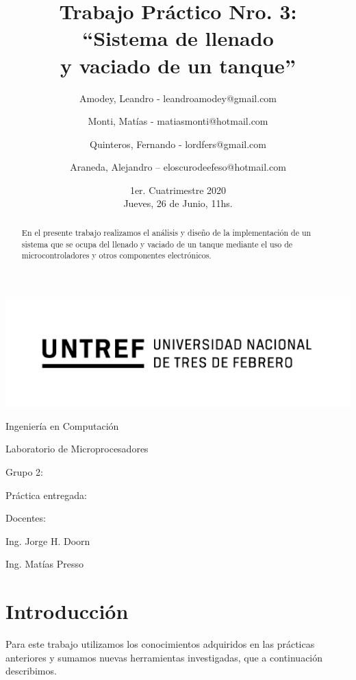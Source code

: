 \documentclass[a4paper]{article}
\title{Trabajo Práctico Nro. 3:\\``Sistema de llenado\\y vaciado de un tanque''}
\author{Amodey, Leandro - leandroamodey@gmail.com
\and Monti, Matías - matiasmonti@hotmail.com
\and Quinteros, Fernando - lordfers@gmail.com
\and Araneda, Alejandro – eloscurodeefeso@hotmail.com}
\date{1er. Cuatrimestre 2020\\Jueves, 26 de Junio, 11hs.}
\def\teacher{Ing. Jorge H. Doorn
\and Ing. Matías Presso}
\begin{document}
\begin{titlepage}\renewcommand\and\par\centering\makeatletter
    \includegraphics{logo.png}\par
    {\Large Ingeniería en Computación \par}\vspace{0.5cm}
    {\LARGE Laboratorio de Microprocesadores \par}\vfill
    {\huge \@title \par}\vfill
    Grupo 2:\par
    \@author\vfill
    Práctica entregada:\par
    \@date\vfill
    Docentes:\par
    \teacher\vspace{1cm}\makeatother
\end{titlepage}

\begin{abstract}

    En el presente trabajo realizamos el análisis y diseño de la
    implementación de un sistema que se ocupa del llenado y vaciado 
    de un tanque mediante el uso de microcontroladores y otros 
    componentes electrónicos.

\end{abstract}

\section{Introducción}

Para este trabajo utilizamos los conocimientos adquiridos en las 
prácticas anteriores y sumamos nuevas herramientas investigadas, 
que a continuación describimos.


\end{document}
